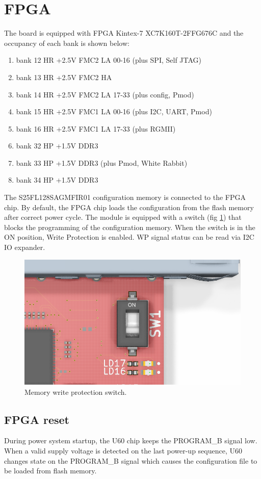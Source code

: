 \documentclass[12pt,oneside,a4]{article}
\begin{document}
\section{FPGA}
The board is equipped with FPGA Kintex-7 XC7K160T-2FFG676C and the occupancy of each bank is shown below:
\begin{enumerate}
	\item bank 12 HR +2.5V FMC2 LA 00-16 (plus SPI, Self JTAG)
	\item bank 13 HR +2.5V FMC2 HA
	\item bank 14 HR +2.5V FMC2 LA 17-33 (plus config, Pmod)
	\item bank 15 HR +2.5V FMC1 LA 00-16 (plus I2C, UART, Pmod)
	\item bank 16 HR +2.5V FMC1 LA 17-33 (plus RGMII)
	\item bank 32 HP +1.5V DDR3
	\item bank 33 HP +1.5V DDR3 (plus Pmod, White Rabbit)
	\item bank 34 HP +1.5V DDR3
\end{enumerate}

The S25FL128SAGMFIR01 configuration memory is connected to the FPGA chip. By default, the FPGA chip loads the configuration from the flash memory after correct power cycle. The module is equipped with a switch (fig \ref{bootsw}) that blocks the programming of the configuration memory. When the switch is in the ON position, Write Protection is enabled. WP signal status can be read via I2C IO expander.

\begin{figure}[H]
\begin{center}
\includegraphics[width=0.8\linewidth]{bootsw.png}
 \caption{Memory write protection switch.}\label{bootsw}
\end{center}
\end{figure}

\subsection{FPGA reset}
During power system startup, the U60 chip keeps the PROGRAM\_B signal low. When a valid supply voltage is detected on the last power-up sequence, U60 changes state on the PROGRAM\_B signal which causes the configuration file to be loaded from flash memory.
\end{document}
